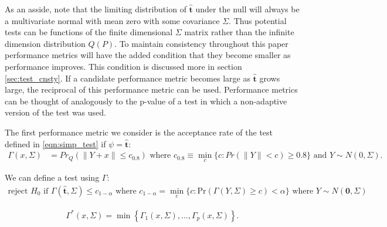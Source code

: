 \documentclass{article}
\newcommand{\vmat}{\Sigma}
\newcommand{\norm}{f}
\newcommand{\tst}{\hat{\boldsymbol{t}}}
\newcommand{\rvt}{Y}
\newcommand{\distv}{Q}
\newcommand{\Gammaf}{\Gamma_{\Sigma}}
\begin{document}
As an asside, note that the limiting distribution of $\tst$ under the null will always be a multivariate normal with mean zero with some covariance $\Sigma$. Thus potential tests can be functions of the finite dimensional $\Sigma$ matrix rather than the infinite dimension distribution $Q(P)$. To maintain consistency throughout this paper performance metrics will have the added condition that they become smaller as performance improves. This condition is discussed more in section \ref{sec:test_cnsty}. If a candidate performance metric becomes large as $\tst$ grows large, the reciprocal of this performance metric can be used. Performance metrics can be thought of analogously to the p-value of a test in which a non-adaptive version of the test was used.

The first performance metric we consider is the acceptance rate of the test defined in  \eqref{eqn:simp_test} if $\psi = \tst$: 
\begin{align}
	\Gamma(x, \Sigma) &= Pr_\distv(\|\rvt + x\| \leq c_{0.8})  \text{ where }  c_{0.8} \equiv \min_{c}\{c : Pr(\|\rvt\| < c) \geq 0.8 \} \text{ and } \rvt \sim N(0, \Sigma). \label{gamma:pow}
\end{align}

We can define a test using $\Gamma$: 
\begin{align*}
	\text{reject } H_0 \text{ if } \Gamma(\tst, \Sigma) \leq c_{1 - \alpha} \text { where } c_{1 - \alpha} = \min_{c}\{c : \text{Pr}(\Gamma(\rvt, \Sigma) \geq c) < \alpha\} \text{ where } \rvt \sim N(\boldsymbol{0}, \Sigma)
\end{align*}

\begin{align*}
	\Gamma^*(x, \Sigma) = \min\left\{\Gamma_{1}(x, \Sigma), \dots, \Gamma_{p}(x, \Sigma)\right\}.
\end{align*}
\end{document}
